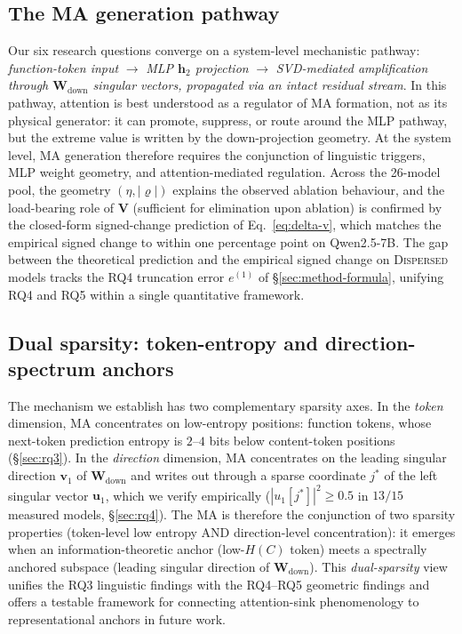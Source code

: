 \documentclass{article}
\newcommand{\Wdown}{\mathbf{W}_{\text{down}}}
\begin{document}
\subsection{The MA generation pathway}

Our six research questions converge on a system-level mechanistic
pathway: \emph{function-token input} $\rightarrow$ \emph{MLP $\mathbf{h}_2$
projection} $\rightarrow$ \emph{SVD-mediated amplification through $\Wdown$
singular vectors, propagated via an intact residual stream}. In this
pathway, attention is best understood as a regulator of MA formation,
not as its physical generator: it can promote, suppress, or route around
the MLP pathway, but the extreme value is written by the down-projection
geometry. At the system level, MA generation therefore requires the
conjunction of linguistic triggers, MLP weight geometry, and
attention-mediated regulation. Across the 26-model pool, the geometry
$(\eta, |\varrho|)$ explains the observed ablation behaviour, and the
load-bearing role of $\mathbf{V}$ (sufficient for elimination upon
ablation) is confirmed by the closed-form signed-change
prediction of Eq.~\eqref{eq:delta-v}, which matches the empirical signed
change to within one percentage point on Qwen2.5-7B. The gap between the
theoretical prediction and the empirical signed change on
\textsc{Dispersed} models tracks the RQ4 truncation error $e^{(1)}$ of
\S\ref{sec:method-formula}, unifying RQ4 and RQ5 within a single
quantitative framework.

\subsection{Dual sparsity: token-entropy and direction-spectrum anchors}
\label{sec:dual-sparsity}

The mechanism we establish has two complementary sparsity axes. In the
\emph{token} dimension, MA concentrates on low-entropy positions:
function tokens, whose next-token prediction entropy is $2$--$4$ bits
below content-token positions (\S\ref{sec:rq3}). In the
\emph{direction} dimension, MA concentrates on the leading singular
direction $\mathbf{v}_1$ of $\Wdown$ and writes out through a sparse
coordinate $j^{*}$ of the left singular vector $\mathbf{u}_1$, which we
verify empirically ($|u_1[j^{*}]|^2 \geq 0.5$ in $13/15$ measured models,
\S\ref{sec:rq4}). The MA is therefore the conjunction of two sparsity
properties (token-level low entropy AND direction-level concentration):
it emerges when an information-theoretic anchor (low-$H(C)$ token)
meets a spectrally anchored subspace (leading singular direction of
$\Wdown$). This \emph{dual-sparsity} view unifies the RQ3
linguistic findings with the RQ4--RQ5 geometric findings and offers a
testable framework for connecting attention-sink phenomenology to
representational anchors in future work.
\end{document}
